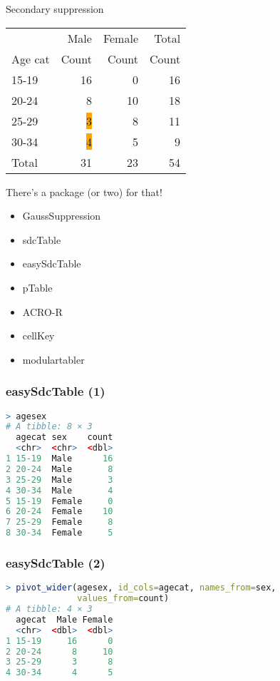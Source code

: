 \documentclass[aspectratio=169,12pt]{beamer} %
\begin{document}
\begin{frame}{Secondary suppression}
	\center
	\begin{tabular}{lrrr}
	& Male & Female & Total \\
	Age cat & Count & Count & Count\\
	\hline
	15-19 & 16 & 0 & 16 \\
	20-24 & 8  & 10 & 18\\
	25-29 & \colorbox{orange}{3}  & 8 & 11 \\
	30-34 & \colorbox{orange}{4} & 5 & 9 \\
	Total & 31  & 23 & 54 \\
	\hline
	\end{tabular}
\end{frame}

\begin{frame}{There's a package (or two) for that!}
	\begin{itemize}
		\item GaussSuppression
		\item sdcTable
		\item easySdcTable
		\item pTable
		\item ACRO-R
		\item cellKey
		\item modulartabler
	\end{itemize}
\end{frame}

\begin{frame}[fragile]\frametitle{easySdcTable (1)}
\begin{lstlisting}[language=R]
> agesex
# A tibble: 8 × 3
  agecat sex    count
  <chr>  <chr>  <dbl>
1 15-19  Male      16
2 20-24  Male       8
3 25-29  Male       3
4 30-34  Male       4
5 15-19  Female     0
6 20-24  Female    10
7 25-29  Female     8
8 30-34  Female     5
\end{lstlisting}
\end{frame}

\begin{frame}[fragile]\frametitle{easySdcTable (2)}
\begin{lstlisting}[language=R]
> pivot_wider(agesex, id_cols=agecat, names_from=sex,
              values_from=count)
# A tibble: 4 × 3
  agecat  Male Female
  <chr>  <dbl>  <dbl>
1 15-19     16      0
2 20-24      8     10
3 25-29      3      8
4 30-34      4      5
\end{lstlisting}
\end{frame}
\end{document}
